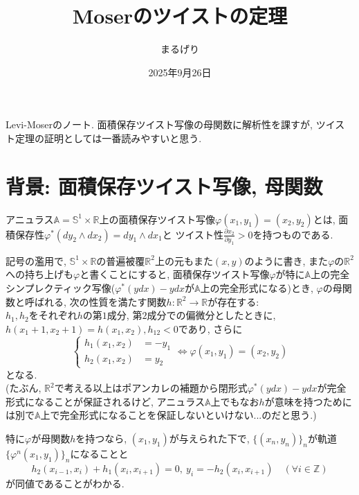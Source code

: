 \documentclass[a4paper]{ujarticle}
\title{Moserのツイストの定理}
\numberwithin{equation}{section}
\theoremstyle{definition}
\begin{document}
\date{2025年9月26日}
\author{まるげり}
\maketitle
    Levi-Moser\cite{LM01}のノート. 
    面積保存ツイスト写像の母関数に解析性を課すが, ツイスト定理の証明としては一番読みやすいと思う. 

    \section{背景: 面積保存ツイスト写像, 母関数}
        アニュラス$\mathbb{A} = \mathbb{S}^1 \times \mathbb{R}$上の面積保存ツイスト写像$\varphi(x_1, y_1) = (x_2, y_2)$とは, 
        面積保存性$\varphi^{*}(dy_2 \wedge dx_2) = d y_1 \wedge d x_1$と
        ツイスト性$\displaystyle \frac{\partial x_2}{\partial y_1} > 0$を持つものである.

        記号の濫用で, $\mathbb{S}^1 \times \mathbb{R}$の普遍被覆$\mathbb{R}^2$上の元もまた$(x, y)$のように書き, 
        また$\varphi$の$\mathbb{R}^2$への持ち上げも$\varphi$と書くことにすると, 
        面積保存ツイスト写像$\varphi$が特に$\mathbb{A}$上の完全シンプレクティック写像($\varphi^{*}(y dx) - y dx$が$\mathbb{A}$上の完全形式になる)とき, 
        $\varphi$の母関数と呼ばれる, 次の性質を満たす関数$h: \mathbb{R}^2 \rightarrow \mathbb{R}$が存在する:\\
        $h_1, h_2$をそれぞれ$h$の第$1$成分, 第$2$成分での偏微分としたときに, $h(x_1 + 1, x_2 + 1) = h(x_1, x_2), h_{12} < 0$であり, 
        さらに
        \[
            \left\{
            \begin{aligned}
                h_1(x_1, x_2) &= - y_1 \\
                h_2(x_1, x_2) &= y_2
            \end{aligned}
            \right.
            \iff \varphi(x_1, y_1) = (x_2, y_2)
        \]
        となる.\\
        (たぶん, $\mathbb{R}^2$で考える以上はポアンカレの補題から閉形式$\varphi^{*}(y dx) - y dx$が完全形式になることが保証されるけど, 
        アニュラス$\mathbb{A}$上でもなお$h$が意味を持つためには別で$\mathbb{A}$上で完全形式になることを保証しないといけない...のだと思う.)
        
        特に$\varphi$が母関数$h$を持つなら, $(x_1, y_1)$が与えられた下で, $\{(x_n, y_n)\}_{n}$が軌道$\{\varphi^{n}(x_1, y_1)\}_{n}$になることと
        \[
                h_2(x_{i-1}, x_{i}) + h_1(x_{i}, x_{i+1}) = 0, \ y_i = - h_2(x_{i}, x_{i+1}) \quad (\forall i \in \mathbb{Z})
        \]
        が同値であることがわかる.
\end{document}
